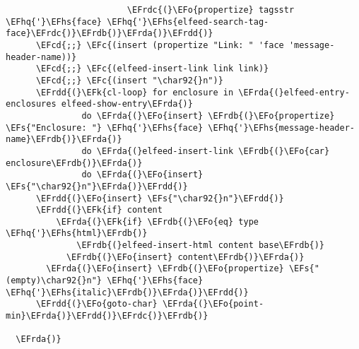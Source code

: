 \documentclass[c]{article}
\theoremstyle{plain}%
\theoremstyle{definition}
\theoremstyle{remark}
\newcommand{\EFc}[1]{\textcolor{EFc}{#1}} %
\newcommand{\EFcd}[1]{\textcolor{EFcd}{#1}} %
\newcommand{\EFs}[1]{\textcolor{EFs}{#1}} %
\newcommand{\EFk}[1]{\textcolor{EFk}{#1}} %
\newcommand{\EFo}[1]{\textcolor{EFo}{#1}} %
\newcommand{\EFhq}[1]{\textcolor{EFhq}{#1}} %
\newcommand{\EFhs}[1]{\textcolor{EFhs}{#1}} %
\newcommand{\EFrda}[1]{\textcolor{EFrda}{#1}} %
\newcommand{\EFrdb}[1]{\textcolor{EFrdb}{#1}} %
\newcommand{\EFrdc}[1]{\textcolor{EFrdc}{#1}} %
\newcommand{\EFrdd}[1]{\textcolor{EFrdd}{#1}} %
\begin{document}
\begin{Code}
\begin{Verbatim}
                        \EFrdc{(}\EFo{propertize} tagsstr \EFhq{'}\EFhs{face} \EFhq{'}\EFhs{elfeed-search-tag-face}\EFrdc{)}\EFrdb{)}\EFrda{)}\EFrdd{)}
      \EFcd{;;} \EFc{(insert (propertize "Link: " 'face 'message-header-name))}
      \EFcd{;;} \EFc{(elfeed-insert-link link link)}
      \EFcd{;;} \EFc{(insert "\char92{}n")}
      \EFrdd{(}\EFk{cl-loop} for enclosure in \EFrda{(}elfeed-entry-enclosures elfeed-show-entry\EFrda{)}
               do \EFrda{(}\EFo{insert} \EFrdb{(}\EFo{propertize} \EFs{"Enclosure: "} \EFhq{'}\EFhs{face} \EFhq{'}\EFhs{message-header-name}\EFrdb{)}\EFrda{)}
               do \EFrda{(}elfeed-insert-link \EFrdb{(}\EFo{car} enclosure\EFrdb{)}\EFrda{)}
               do \EFrda{(}\EFo{insert} \EFs{"\char92{}n"}\EFrda{)}\EFrdd{)}
      \EFrdd{(}\EFo{insert} \EFs{"\char92{}n"}\EFrdd{)}
      \EFrdd{(}\EFk{if} content
          \EFrda{(}\EFk{if} \EFrdb{(}\EFo{eq} type \EFhq{'}\EFhs{html}\EFrdb{)}
              \EFrdb{(}elfeed-insert-html content base\EFrdb{)}
            \EFrdb{(}\EFo{insert} content\EFrdb{)}\EFrda{)}
        \EFrda{(}\EFo{insert} \EFrdb{(}\EFo{propertize} \EFs{"(empty)\char92{}n"} \EFhq{'}\EFhs{face} \EFhq{'}\EFhs{italic}\EFrdb{)}\EFrda{)}\EFrdd{)}
      \EFrdd{(}\EFo{goto-char} \EFrda{(}\EFo{point-min}\EFrda{)}\EFrdd{)}\EFrdc{)}\EFrdb{)}

  \EFrda{)}
\end{Verbatim}
\end{Code}
\end{document}
